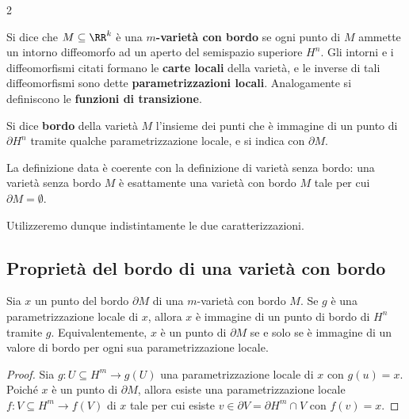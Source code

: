 \begin{multicols*}{2}
    \begin{definition}
        Si dice che $M \subseteq \RR^k$ è una \textbf{$m$-varietà con bordo} se
        ogni punto di $M$ ammette un intorno diffeomorfo ad un aperto del semispazio
        superiore $H^n$. Gli intorni e i diffeomorfismi citati formano le
        \textbf{carte locali} della varietà, e le inverse di tali diffeomorfismi
        sono dette \textbf{parametrizzazioni locali}. Analogamente si definiscono
        le \textbf{funzioni di transizione}. \smallskip

        Si dice \textbf{bordo} della varietà $M$ l'insieme dei punti che è immagine
        di un punto di $\partial H^n$ tramite qualche parametrizzazione locale, e
        si indica con $\partial M$.
    \end{definition}

    \begin{remark}
        La definizione data è coerente con la definizione di varietà senza bordo: una
        varietà senza bordo $M$ è esattamente una varietà con bordo $M$ tale per cui
        $\partial M = \emptyset$. \smallskip

        Utilizzeremo dunque indistintamente le due caratterizzazioni.
    \end{remark}

    \subsection{Proprietà del bordo di una varietà con bordo}

    \begin{lemma} \label{lem:punti_di_bordo}
        Sia $x$ un punto del bordo $\partial M$ di una $m$-varietà con bordo $M$. Se
        $g$ è una parametrizzazione locale di $x$, allora $x$ è immagine di un
        punto di bordo di $H^n$ tramite $g$. Equivalentemente, $x$ è un punto di
        $\partial M$ se e solo se è immagine di un valore di bordo per
        ogni sua parametrizzazione locale.
    \end{lemma}

    \begin{proof}
        Sia $g : U \subseteq H^m \to g(U)$ una parametrizzazione locale di $x$ con
        $g(u) = x$. Poiché $x$ è un punto di $\partial M$,
        allora esiste una parametrizzazione locale $f : V \subseteq H^m \to f(V)$
        di $x$ tale per cui esiste $v \in \partial V = \partial H^m \cap V$ con
        $f(v) = x$. \smallskip


\end{proof}
\end{multicols*}
